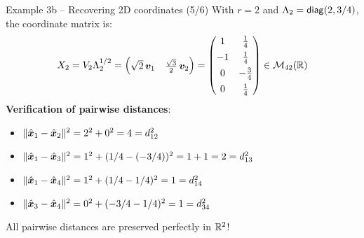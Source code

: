 \documentclass[aspectratio=169]{beamer}\usepackage[]{graphicx}\usepackage[]{xcolor}
\begin{document}
\begin{frame}{Example 3b -- Recovering 2D coordinates (5/6)}
With $r = 2$ and $\Lambda_2 = \mathsf{diag}(2, 3/4)$, the coordinate matrix is:
\[
X_2 = V_2 \Lambda_2^{1/2} = \begin{pmatrix} \sqrt{2}\,\bm{v}_1 & \frac{\sqrt{3}}{2}\,\bm{v}_2 \end{pmatrix}
= \begin{pmatrix}
1 & \frac{1}{4} \\[0.15cm]
-1 & \frac{1}{4} \\[0.15cm]
0 & -\frac{3}{4} \\[0.15cm]
0 & \frac{1}{4}
\end{pmatrix} \in \mathcal{M}_{42}(\mathbb{R})
\]
\vfill
\textbf{Verification of pairwise distances}:
\begin{itemize}
\item $\|\hat{\bm{x}}_1 - \hat{\bm{x}}_2\|^2 = 2^2 + 0^2 = 4 = d_{12}^2$
\item $\|\hat{\bm{x}}_1 - \hat{\bm{x}}_3\|^2 = 1^2 + (1/4 - (-3/4))^2 = 1 + 1 = 2 = d_{13}^2$
\item $\|\hat{\bm{x}}_1 - \hat{\bm{x}}_4\|^2 = 1^2 + (1/4 - 1/4)^2 = 1 = d_{14}^2$
\item $\|\hat{\bm{x}}_3 - \hat{\bm{x}}_4\|^2 = 0^2 + (-3/4 - 1/4)^2 = 1 = d_{34}^2$
\end{itemize}
\vfill
All pairwise distances are preserved perfectly in $\mathbb{R}^2$!
\end{frame}
\end{document}
